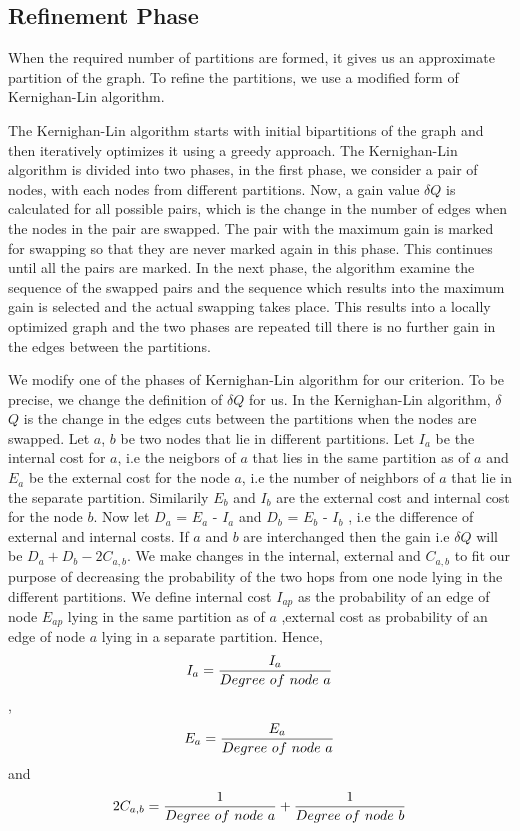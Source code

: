\documentclass[letterpaper]{article}
\begin{document}
 
\subsection{Refinement Phase}
When the required number of partitions are formed, it gives us an approximate partition of the graph. To refine the partitions, 
we use a modified form of Kernighan-Lin algorithm\cite{22}.


    The Kernighan-Lin algorithm starts with initial bipartitions of the graph and then iteratively optimizes it using a greedy approach. The Kernighan-Lin algorithm is divided into 
two phases, in the first phase, we consider a pair of nodes, with each nodes from different partitions. Now, a gain value $\delta$$Q$ is calculated for all possible pairs, which is the change in the number of edges when the nodes in the pair are swapped. The pair with the maximum  gain is marked for swapping so that they are never marked again in this phase. This continues until all the pairs are marked. In the next phase, the algorithm examine the sequence of the swapped pairs and the sequence which results into the maximum gain is selected and the actual swapping takes place. This results into a locally optimized graph and the two phases are repeated till there is no further gain in the edges between the partitions.


    We modify one of the phases of  Kernighan-Lin algorithm for our criterion. To be precise, we change the definition of $\delta$$Q$ for us. In the Kernighan-Lin algorithm, $\delta$$Q$ is the change in the edges cuts between the partitions when the nodes are swapped. Let $a$, $b$ be two nodes that lie in different partitions. Let $I_a$ be the internal cost for $a$, i.e the neigbors of $a$ that lies in the same partition as of $a$ and  $E_a$ be the external cost for the node $a$, i.e the number of neighbors of $a$ that lie in the separate partition. Similarily $E_b$ and $I_b$ are the external cost and internal cost for the node $b$. Now let $D_a$ = $E_a$ - $I_a$ and $D_b$ = $E_b$ - $I_b$ , i.e the difference of external and internal costs. If $a$ and $b$ are interchanged then the gain i.e $\delta$$Q$ will be $D_a + D_b -2C_{a,b}$. We make changes in the internal, external and $C_{a,b}$ to fit our purpose of decreasing the probability of the two hops from one node lying in the different partitions. We define internal cost $I_{ap}$ as the probability of an edge of node $E_{ap}$ lying in the same partition as of $a$ ,external cost as probability of an edge of node $a$ lying in a separate partition. Hence,\\ 
\begin{displaymath}I_{a}=\frac{I_a}{Degree\ of\ node\ a }\\\end{displaymath},
\\\begin{displaymath}E_{a}=\frac{E_a}{Degree\ of\ node\ a}\\\end{displaymath} and\\
\begin{displaymath}2C_{a,b}=\frac{1}{Degree\ of\ node\ a}+\frac{1}{Degree\ of\ node\ b}\\\end{displaymath}
\end{document}
